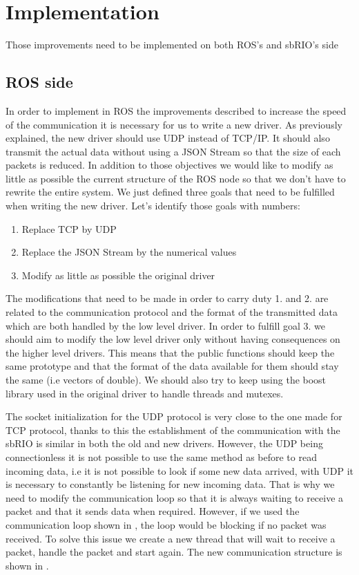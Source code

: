\section{Implementation}
Those improvements need to be implemented on both ROS's and sbRIO's side

\subsection{ROS side}

In order to implement in ROS the improvements described to increase the speed of the communication it is necessary for us to write a new driver. As previously explained, the new driver should use UDP instead of TCP/IP. It should also transmit the actual data without using a \gls{JSON} Stream so that the size of each packets is reduced. In addition to those objectives we would like to modify as little as possible the current structure of the ROS node so that we don't have to rewrite the entire system. 
We just defined three goals that need to be fulfilled when writing the new driver. Let's identify those goals with numbers:
\begin{enumerate}
	\item Replace TCP by UDP
	\item Replace the \gls{JSON} Stream by the numerical values
	\item Modify as little as possible the original driver
\end{enumerate}

The modifications that need to be made in order to carry duty 1. and 2. are related to the communication protocol and the format of the transmitted data which are both handled by the low level driver. In order to fulfill goal 3. we should aim to modify the low level driver only without having consequences on the higher level drivers. This means that the public functions should keep the same prototype and that the format of the data available for them should stay the same (i.e vectors of double). We should also try to keep using the boost library used in the original driver to handle threads and mutexes.

The socket initialization for the UDP protocol is very close to the one made for TCP protocol, thanks to this the establishment of the communication with the sbRIO is similar in both the old and new drivers. However, the UDP being connectionless it is not possible to use the same method as before to read incoming data, i.e it is not possible to look if some new data arrived, with UDP it is necessary to constantly be listening for new incoming data. That is why we need to modify the communication loop so that it is always waiting to receive a packet and that it sends data when required. However, if we used the communication loop shown in , the loop would be blocking if no packet was received. To solve this issue we create a new thread that will wait to receive a packet, handle the packet and start again. The new communication structure is shown in .

